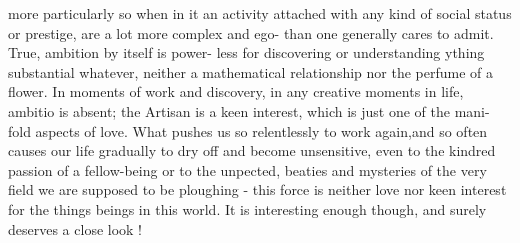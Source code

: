 more particularly so when in it  an activity attached with any kind of
social status or prestige, are a lot more complex and ego- than
one generally cares to admit.  True,  ambition by itself is  power-%
less for discovering or understanding  ything substantial whatever,
neither a mathematical relationship nor the perfume of a flower.  In 
moments of work and  discovery,  in any creative moments in life,  ambitio
is absent; the Artisan is a keen interest,  which is just one of the mani-%
fold aspects of love.  What  pushes us so relentlessly to work again,and
so often causes our life  gradually to dry off and become unsensitive,
even to the kindred passion of a fellow-being\hand{,} or to the unpected,
beaties and mysteries of the very field we are supposed to be ploughing
-  this force is neither love nor keen interest for the things  beings
in this world.  It is interesting enough though,  and surely deserves
a close look !


